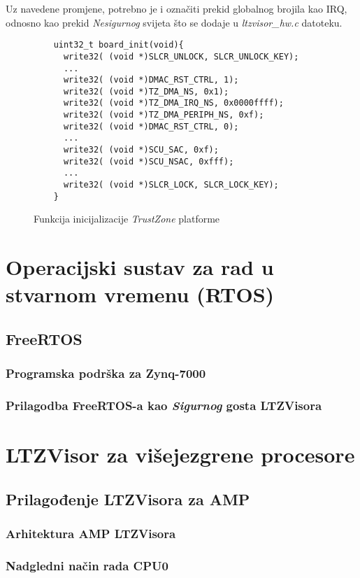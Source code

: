 \documentclass[times, utf8, diplomski, numeric]{fer}
\begin{document}
Uz navedene promjene, potrebno je i označiti prekid globalnog brojila kao IRQ, odnosno kao prekid \textit{Nesigurnog} svijeta što se
dodaje u \textit{ltzvisor\_hw.c} datoteku.
\begin{figure}[H]
  \lstset{breaklines=true, xleftmargin=.05\textwidth}
  \begin{lstlisting}
    uint32_t board_init(void){
      write32( (void *)SLCR_UNLOCK, SLCR_UNLOCK_KEY);
      ...
      write32( (void *)DMAC_RST_CTRL, 1);
      write32( (void *)TZ_DMA_NS, 0x1);
      write32( (void *)TZ_DMA_IRQ_NS, 0x0000ffff);
      write32( (void *)TZ_DMA_PERIPH_NS, 0xf);
      write32( (void *)DMAC_RST_CTRL, 0);
      ...
      write32( (void *)SCU_SAC, 0xf);
      write32( (void *)SCU_NSAC, 0xfff);
      ...
      write32( (void *)SLCR_LOCK, SLCR_LOCK_KEY);
    }
  \end{lstlisting}
  \caption{Funkcija inicijalizacije \textit{TrustZone} platforme}
  \label{tz_init}
\end{figure}

\chapter{Operacijski sustav za rad u stvarnom vremenu (RTOS)}
\section{FreeRTOS}
\subsection{Programska podrška za Zynq-7000}
\subsection{Prilagodba FreeRTOS-a kao \textit{Sigurnog} gosta LTZVisora}

\chapter{LTZVisor za višejezgrene procesore}
\section{Prilagođenje LTZVisora za AMP}
\subsection{Arhitektura AMP LTZVisora}
\subsection{Nadgledni način rada CPU0}
\end{document}
